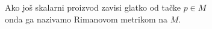 \documentclass[preview]{standalone}
\begin{document}
\begin{center}
Ako još skalarni proizvod zavisi glatko od tačke \(p \in M\)\\
        onda ga nazivamo Rimanovom metrikom na \(M\).
\end{center}
\end{document}

